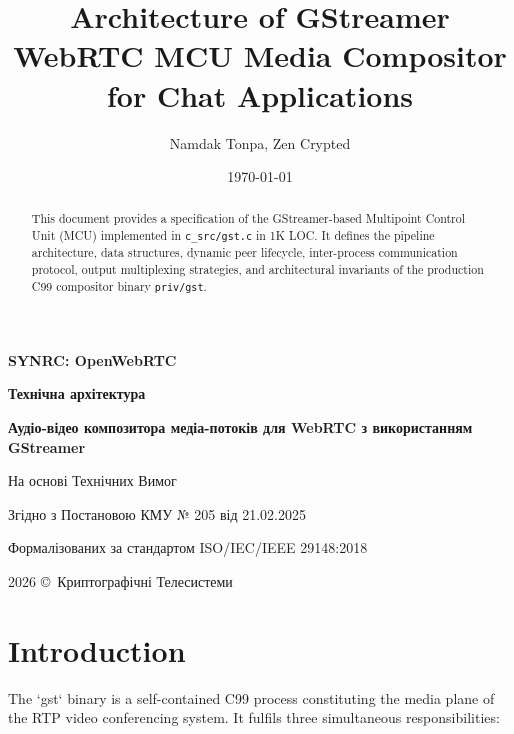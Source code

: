 \documentclass{article}
\title{Architecture of GStreamer WebRTC MCU Media Compositor for Chat Applications}
\author{Namdak Tonpa, Zen Crypted}
\date{\today}
\newcommand\HUGE[1]{\fontsize{40}{40}\selectfont #1}
\begin{document}
\begin{titlepage}
  \AddToShipoutPictureBG*{\AtPageLowerLeft{\color{nato}\rule{\paperwidth}{\paperheight}}}
  \color{white}\thispagestyle{empty}\vspace*{3cm}\centering
  {\Huge  \textbf{SYNRC: OpenWebRTC} \par} \vspace{1.5cm}
  {\HUGE  \textbf{Технічна архітектура} \par} \vspace{1.5cm}
  {\LARGE \textbf{Аудіо-відео композитора медіа-потоків для WebRTC з використанням GStreamer} \par} \vspace{1.5cm}
  {\large На основі Технічних Вимог \par}
  {\large Згідно з Постановою КМУ № 205 від 21.02.2025 \par}
  {\large Формалізованих за стандартом ISO/IEC/IEEE 29148:2018 \par}
  \vfill
  {\large 2026 \copyright\ Криптографічні Телесистеми \par}
\end{titlepage}

\newpage
\maketitle

\begin{abstract}
This document provides a specification of the GStreamer-based Multipoint Control Unit (MCU)
implemented in \texttt{c\_src/gst.c} in 1K LOC. It defines the pipeline architecture, data structures,
dynamic peer lifecycle, inter-process communication protocol, output multiplexing strategies,
and architectural invariants of the production C99 compositor binary \texttt{priv/gst}.
\end{abstract}

\newpage
\tableofcontents

\newpage
\section{Introduction}

The `gst` binary is a self-contained C99 process constituting the media plane
of the RTP video conferencing system. It fulfils three simultaneous responsibilities:
\end{document}

